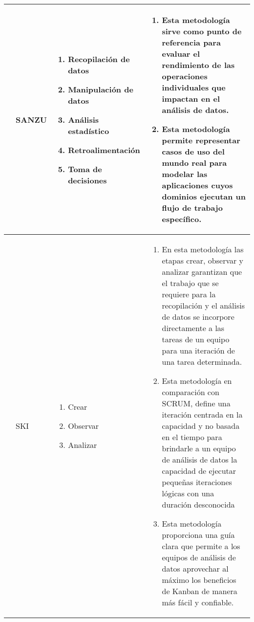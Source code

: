 \begin{table*}[!htb]
	\footnotesize
	\begin{threeparttable}	
		\begin{tabular}{ p{1cm} p{2cm} p{5cm} p{6.5cm}   } \toprule
			\cite{Watson2017}
			&SANZU
			&  \begin{enumerate}
				\item Recopilación de datos
				\item Manipulación de datos
				\item Análisis estadístico
				\item Retroalimentación
				\item Toma de decisiones 
			\end{enumerate}
			& \begin{enumerate}
				\item Esta metodología sirve como punto de referencia para evaluar el rendimiento de las operaciones individuales que impactan en el análisis de datos.
				\item Esta metodología permite representar casos de uso del mundo real para modelar las aplicaciones cuyos dominios ejecutan un flujo de trabajo específico.
			\end{enumerate}
			\\ \hline
			\cite{Saltz2019}
			&SKI
			&  \begin{enumerate}
				\item Crear
				\item Observar
				\item Analizar
			\end{enumerate}
			& \begin{enumerate}
				\item En esta metodología las etapas crear, observar y analizar garantizan que el trabajo que se requiere para la recopilación y el análisis de datos se incorpore directamente a las tareas de un equipo para una iteración de una tarea determinada.  
				\item Esta metodología en comparación con SCRUM, define una iteración centrada en la capacidad y no basada en el tiempo para brindarle a un equipo de análisis de datos la capacidad de ejecutar pequeñas iteraciones lógicas con una duración desconocida
				\item Esta metodología proporciona una guía clara que permite a los equipos de análisis de datos aprovechar al máximo los beneficios de Kanban de manera más fácil y confiable.

\end{enumerate}
\end{tabular}
\end{threeparttable}
\end{table*}
